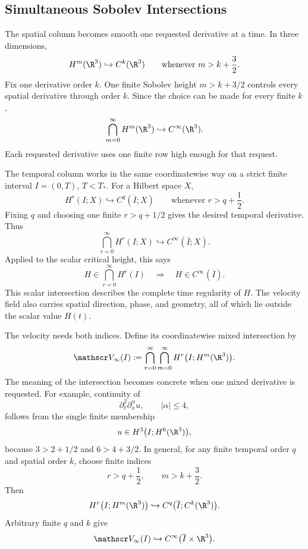 
\subsection{Simultaneous Sobolev Intersections}\label{sub:SimultaneousSobolevIntersections}

The spatial column becomes smooth one requested derivative at a time.
In three dimensions,
\[
  H^m(\R^3)
  \hookrightarrow
  C^k(\R^3)
  \qquad
  \text{whenever }
  m>k+\frac32.
\]
Fix one derivative order \(k\).
One finite Sobolev height \(m>k+3/2\) controls every spatial derivative through order \(k\).
Since the choice can be made for every finite \(k\),
\[
  \bigcap_{m=0}^{\infty}H^m(\R^3)
  \hookrightarrow
  C^\infty(\R^3).
\]
Each requested derivative uses one finite row high enough for that request.

The temporal column works in the same coordinatewise way on a strict finite interval \(I=(0,T)\), \(T<T_*\).
For a Hilbert space \(X\),
\[
  H^r(I;X)
  \hookrightarrow
  C^q(\overline I;X)
  \qquad
  \text{whenever }
  r>q+\frac12.
\]
Fixing \(q\) and choosing one finite \(r>q+1/2\) gives the desired temporal derivative.
Thus
\[
  \bigcap_{r=0}^{\infty}H^r(I;X)
  \hookrightarrow
  C^\infty(\overline I;X).
\]
Applied to the scalar critical height, this says
\[
  H\in
  \bigcap_{r=0}^{\infty}H^r(I)
  \quad\Longrightarrow\quad
  H\in C^\infty(\overline I).
\]
This scalar intersection describes the complete time regularity of \(H\).
The velocity field also carries spatial direction, phase, and geometry, all of which lie outside the scalar value \(H(t)\).

The velocity needs both indices.
Define its coordinatewise mixed intersection by
\[
  \mathscr V_\infty(I)
  :=
  \bigcap_{r=0}^{\infty}
  \bigcap_{m=0}^{\infty}
  H^r\bigl(I;H^m(\R^3)\bigr).
\]
The meaning of the intersection becomes concrete when one mixed derivative is requested.
For example, continuity of
\[
  \partial_t^2\partial_x^\alpha u,
  \qquad
  |\alpha|\leq4,
\]
follows from the single finite membership
\[
  u\in H^3\bigl(I;H^6(\R^3)\bigr),
\]
because \(3>2+1/2\) and \(6>4+3/2\).
In general, for any finite temporal order \(q\) and spatial order \(k\), choose finite indices
\[
  r>q+\frac12,
  \qquad
  m>k+\frac32.
\]
Then
\[
  H^r\bigl(I;H^m(\R^3)\bigr)
  \hookrightarrow
  C^q\bigl(\overline I;C^k(\R^3)\bigr).
\]
Arbitrary finite \(q\) and \(k\) give
\[
  \mathscr V_\infty(I)
  \hookrightarrow
  C^\infty\bigl(\overline I\times\R^3\bigr).
\]

